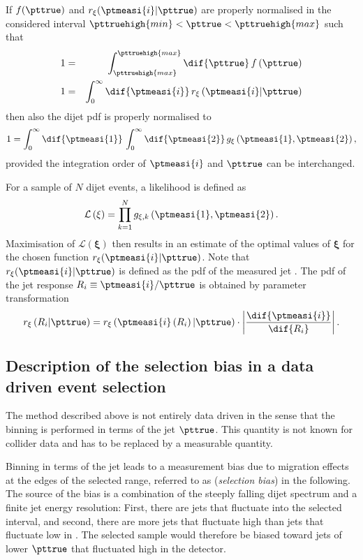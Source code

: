 If $f(\pttrue)$ and $r_{\mathbf{\xi}}(\ptmeasi{i}|\pttrue)$ are properly normalised in the considered interval \mbox{$\pttruehigh{min} < \pttrue < \pttruehigh{max}$} such that
\begin{eqnarray*}
  1 & = & \int^{\pttruehigh{max}}_{\pttruehigh{max}}\dif{\pttrue}\,f\left(\pttrue\right) \\
  1 & = & \int^{\infty}_{0}\dif{\ptmeasi{i}}\,r_{\mathbf{\xi}}\left(\ptmeasi{i}|\pttrue\right)
\end{eqnarray*}
then also the dijet pdf is properly normalised to
\begin{equation*}
  1 = \int^{\infty}_{0}\dif{\ptmeasi{1}}\,\int^{\infty}_{0}\dif{\ptmeasi{2}}\, g_{\mathbf{\xi}}\left(\ptmeasi{1},\ptmeasi{2}\right),
\end{equation*}
provided the integration order of $\ptmeasi{i}$ and $\pttrue$ can be interchanged.

For a sample of $N$ dijet events, a likelihood is defined as
\begin{equation}
  \label{eq:ResFit:Likelihood}
  \mathcal{L}\left(\mathbf{\xi}\right) = \prod^{N}_{k=1} g_{\mathbf{\xi},k}\left(\ptmeasi{1},\ptmeasi{2}\right).
\end{equation}
Maximisation of $\mathcal{L}(\mathbf{\xi})$ then results in an
estimate of the optimal values of $\mathbf{\xi}$ for the chosen
function $r_{\mathbf{\xi}}(\ptmeasi{i}|\pttrue)$.
Note that $r_{\mathbf{\xi}}(\ptmeasi{i}|\pttrue)$ is defined as the
pdf of the measured jet \pt.
The pdf of the jet \pt response \mbox{$R_{i}\equiv\ptmeasi{i} / \pttrue$} is obtained by parameter transformation
\begin{equation*}
  r_{\mathbf{\xi}}\left(R_{i}|\pttrue\right) =
  r_{\mathbf{\xi}}\left(\ptmeasi{i}\left(R_{i}\right)|\pttrue\right)\cdot\left|\frac{\dif{\ptmeasi{i}}}{\dif{R_{i}}}\right|.
\end{equation*}



\subsection{Description of the selection bias in a data driven event selection}\label{sec:ResFit:Method:Biases}

The method described above is not entirely data driven in the sense that the binning is performed in terms
of the jet $\pttrue$.
This quantity is not known for collider data and has to be replaced by a measurable quantity. 

Binning in terms of the jet \ptmeas leads to a measurement bias due to migration effects at the edges of 
the selected \pt range, referred to as (\textit{selection bias}) in the following.
The source of the bias is a combination of the steeply falling dijet \pt spectrum and a finite jet energy resolution:
First, there are jets that fluctuate into the selected \pt interval, and second, there are more jets that fluctuate high than jets that fluctuate low in \pt.
The selected sample would therefore be biased toward jets of lower $\pttrue$ that fluctuated high in the detector.

